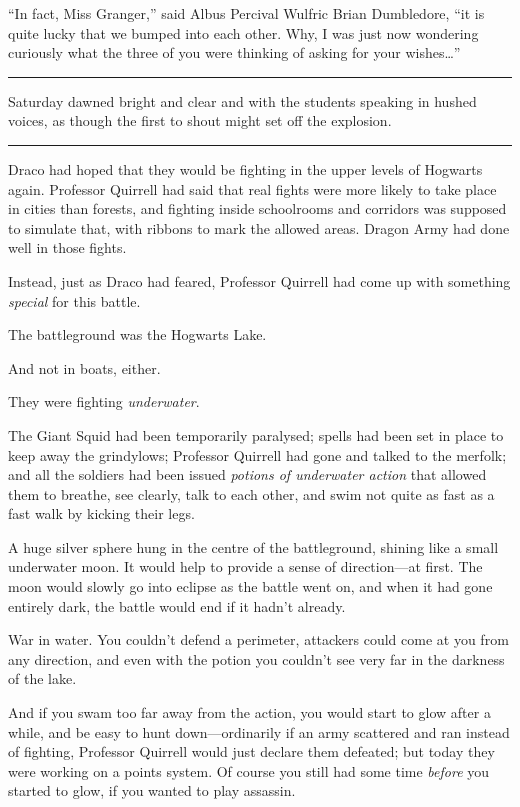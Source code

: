 ``In fact, Miss Granger,'' said Albus Percival Wulfric Brian Dumbledore,
``it is quite lucky that we bumped into each other. Why, I was just now
wondering curiously what the three of you were thinking of asking for
your wishes\ldots{}''

\begin{center}\rule{3in}{0.4pt}\end{center}

Saturday dawned bright and clear and with the students speaking in
hushed voices, as though the first to shout might set off the explosion.

\begin{center}\rule{3in}{0.4pt}\end{center}

Draco had hoped that they would be fighting in the upper levels of
Hogwarts again. Professor Quirrell had said that real fights were more
likely to take place in cities than forests, and fighting inside
schoolrooms and corridors was supposed to simulate that, with ribbons to
mark the allowed areas. Dragon Army had done well in those fights.

Instead, just as Draco had feared, Professor Quirrell had come up with
something \emph{special} for this battle.

The battleground was the Hogwarts Lake.

And not in boats, either.

They were fighting \emph{underwater}.

The Giant Squid had been temporarily paralysed; spells had been set in
place to keep away the grindylows; Professor Quirrell had gone and
talked to the merfolk; and all the soldiers had been issued
\emph{potions of underwater action} that allowed them to breathe, see
clearly, talk to each other, and swim not quite as fast as a fast walk
by kicking their legs.

A huge silver sphere hung in the centre of the battleground, shining
like a small underwater moon. It would help to provide a sense of
direction---at first. The moon would slowly go into eclipse as the
battle went on, and when it had gone entirely dark, the battle would end
if it hadn't already.

War in water. You couldn't defend a perimeter, attackers could come at
you from any direction, and even with the potion you couldn't see very
far in the darkness of the lake.

And if you swam too far away from the action, you would start to glow
after a while, and be easy to hunt down---ordinarily if an army
scattered and ran instead of fighting, Professor Quirrell would just
declare them defeated; but today they were working on a points system.
Of course you still had some time \emph{before} you started to glow, if
you wanted to play assassin.

